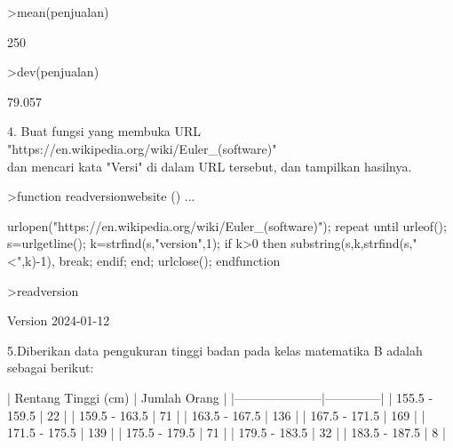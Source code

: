 \documentclass{article}
\begin{document}
\begin{eulernotebook}
\begin{eulercomment}
\begin{eulercomment}
\begin{eulercomment}
\begin{eulercomment}
\begin{eulercomment}
\begin{eulercomment}
\begin{eulercomment}
\begin{eulercomment}
\begin{eulercomment}
\begin{eulercomment}
\begin{eulercomment}
\begin{eulercomment}
\begin{eulercomment}
\begin{eulercomment}
\begin{eulercomment}
\begin{eulercomment}
\begin{eulerprompt}
>mean(penjualan)
\end{eulerprompt}
\begin{euleroutput}
  250
\end{euleroutput}
\begin{eulerprompt}
>dev(penjualan)
\end{eulerprompt}
\begin{euleroutput}
  79.057
\end{euleroutput}
\begin{eulercomment}
4. Buat fungsi yang membuka URL\\
"https://en.wikipedia.org/wiki/Euler\_(software)"\\
dan mencari kata "Versi" di dalam URL tersebut, dan tampilkan
hasilnya.
\end{eulercomment}
\begin{eulerprompt}
>function readversionwebsite () ...
\end{eulerprompt}
\begin{eulerudf}
  urlopen("https://en.wikipedia.org/wiki/Euler_(software)");
  repeat
     until urleof();
     s=urlgetline();
     k=strfind(s,"version",1);
     if k>0 then substring(s,k,strfind(s,"<",k)-1), break; endif;
  end;
  urlclose();
  endfunction
\end{eulerudf}
\begin{eulerprompt}
>readversion
\end{eulerprompt}
\begin{euleroutput}
  Version 2024-01-12
\end{euleroutput}
\begin{eulercomment}
5.Diberikan data pengukuran tinggi badan pada kelas matematika B
adalah sebagai berikut:

\end{eulercomment}
\begin{eulerttcomment}
           | Rentang Tinggi (cm) | Jumlah Orang |
           |---------------------|--------------|
           | 155.5 - 159.5       |      22      |
           | 159.5 - 163.5       |      71      |
           | 163.5 - 167.5       |     136      |
           | 167.5 - 171.5       |     169      |
           | 171.5 - 175.5       |     139      |
           | 175.5 - 179.5       |      71      |
           | 179.5 - 183.5       |      32      |
           | 183.5 - 187.5       |       8      |
\end{eulerttcomment}
\begin{eulercomment}


\end{eulercomment}
\end{eulercomment}
\end{eulercomment}
\end{eulercomment}
\end{eulercomment}
\end{eulercomment}
\end{eulercomment}
\end{eulercomment}
\end{eulercomment}
\end{eulercomment}
\end{eulercomment}
\end{eulercomment}
\end{eulercomment}
\end{eulercomment}
\end{eulercomment}
\end{eulercomment}
\end{eulercomment}
\end{eulernotebook}
\end{document}
